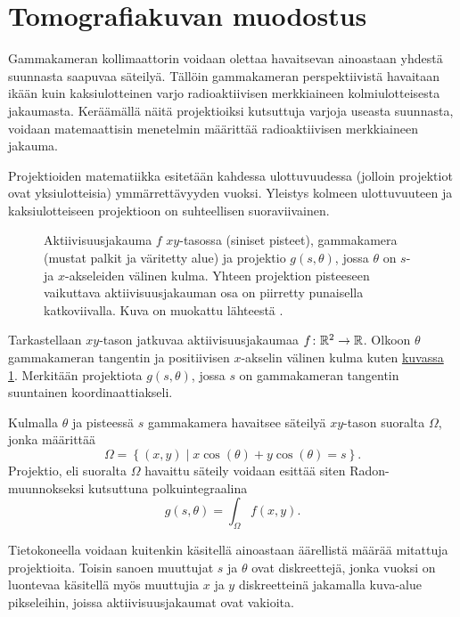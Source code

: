 \section{Tomografiakuvan muodostus}
Gammakameran kollimaattorin voidaan olettaa havaitsevan ainoastaan yhdestä suunnasta saapuvaa säteilyä. Tällöin gammakameran perspektiivistä havaitaan ikään kuin kaksiulotteinen varjo radioaktiivisen merkkiaineen kolmiulotteisesta jakaumasta. Keräämällä näitä projektioiksi kutsuttuja varjoja useasta suunnasta, voidaan matemaattisin menetelmin määrittää radioaktiivisen merkkiaineen jakauma.

Projektioiden matematiikka esitetään kahdessa ulottuvuudessa (jolloin projektiot ovat yksiulotteisia) ymmärrettävyyden vuoksi. Yleistys kolmeen ulottuvuuteen ja kaksiulotteiseen projektioon on suhteellisen suoraviivainen.

\begin{figure}[H]
    \centering
    \captionsetup{width=.9\textwidth}
    
    \caption{Aktiivisuusjakauma $f$ $xy$-tasossa (siniset pisteet), gammakamera (mustat palkit ja väritetty alue) ja projektio $g(s, \theta)$, jossa $\theta$ on $s$- ja $x$-akseleiden välinen kulma. Yhteen projektion pisteeseen vaikuttava aktiivisuusjakauman osa on piirretty punaisella katkoviivalla. Kuva on muokattu lähteestä \cite{bruyant_analytic_2002}.}
    \label{fig:projektio}
\end{figure}

Tarkastellaan $xy$-tason jatkuvaa aktiivisuusjakaumaa $f\colon\mathbb{R}^{2}\to\mathbb{R}$. Olkoon $\theta$ gammakameran tangentin ja positiivisen $x$-akselin välinen kulma kuten \hyperref[fig:projektio]{kuvassa \ref*{fig:projektio}}. Merkitään projektiota $g(s, \theta)$, jossa $s$ on gammakameran tangentin suuntainen koordinaattiakseli.

Kulmalla $\theta$ ja pisteessä $s$ gammakamera havaitsee säteilyä $xy$-tason suoralta $\Omega$, jonka määrittää
\begin{equation*}
    \Omega=\left\{ (x, y) \mid x\cos(\theta)+y\cos(\theta)=s \right\}.
\end{equation*}
Projektio, eli suoralta $\Omega$ havaittu säteily voidaan esittää siten Radon-muunnokseksi kutsuttuna polkuintegraalina\cite{radon_determination_1986, bruyant_analytic_2002}
\begin{equation}\label{eqn:radon-muunnos}
    g(s, \theta)=\int_{\Omega}f(x, y).
\end{equation}

Tietokoneella voidaan kuitenkin käsitellä ainoastaan äärellistä määrää mitattuja projektioita. Toisin sanoen muuttujat $s$ ja $\theta$ ovat diskreettejä, jonka vuoksi on luontevaa käsitellä myös muuttujia $x$ ja $y$ diskreetteinä jakamalla kuva-alue pikseleihin, joissa aktiivisuusjakaumat ovat vakioita.

